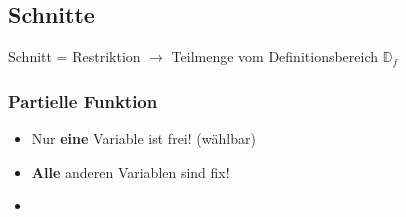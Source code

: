 \subsection{Schnitte}
Schnitt = Restriktion $\rightarrow$ Teilmenge vom Definitionsbereich ${\mathbb{D}_f}$


\subsubsection{Partielle Funktion}

\begin{itemize}
    \item Nur \textbf{eine} Variable ist frei! (wählbar)
    \item \textbf{Alle} anderen Variablen sind fix!
    \item[] 
\end{itemize}


